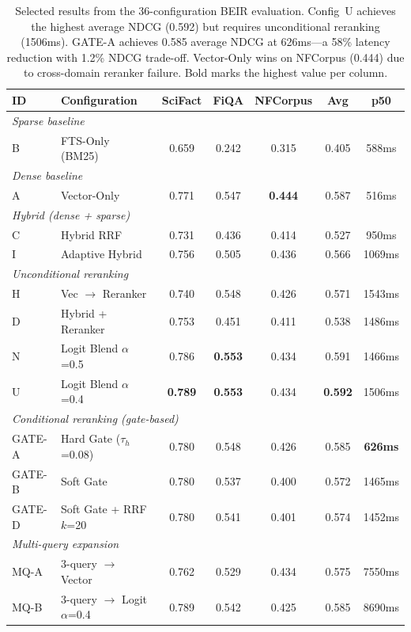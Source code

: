 \documentclass[11pt]{article}
\begin{document}
\begin{table}[H]
\centering
\small
\begin{tabular}{llccccc}
\toprule
\textbf{ID} & \textbf{Configuration} & \textbf{SciFact} & \textbf{FiQA} & \textbf{NFCorpus} & \textbf{Avg} & \textbf{p50} \\
\midrule
\multicolumn{7}{l}{\textit{Sparse baseline}} \\
B & FTS-Only (BM25) & 0.659 & 0.242 & 0.315 & 0.405 & 588ms \\
\midrule
\multicolumn{7}{l}{\textit{Dense baseline}} \\
A & Vector-Only & 0.771 & 0.547 & \textbf{0.444} & 0.587 & 516ms \\
\midrule
\multicolumn{7}{l}{\textit{Hybrid (dense + sparse)}} \\
C & Hybrid RRF & 0.731 & 0.436 & 0.414 & 0.527 & 950ms \\
I & Adaptive Hybrid & 0.756 & 0.505 & 0.436 & 0.566 & 1069ms \\
\midrule
\multicolumn{7}{l}{\textit{Unconditional reranking}} \\
H & Vec $\to$ Reranker & 0.740 & 0.548 & 0.426 & 0.571 & 1543ms \\
D & Hybrid + Reranker & 0.753 & 0.451 & 0.411 & 0.538 & 1486ms \\
N & Logit Blend $\alpha$=0.5 & 0.786 & \textbf{0.553} & 0.434 & 0.591 & 1466ms \\
U & Logit Blend $\alpha$=0.4 & \textbf{0.789} & \textbf{0.553} & 0.434 & \textbf{0.592} & 1506ms \\
\midrule
\multicolumn{7}{l}{\textit{Conditional reranking (gate-based)}} \\
GATE-A & Hard Gate ($\tau_h$=0.08) & 0.780 & 0.548 & 0.426 & 0.585 & \textbf{626ms} \\
GATE-B & Soft Gate & 0.780 & 0.537 & 0.400 & 0.572 & 1465ms \\
GATE-D & Soft Gate + RRF $k$=20 & 0.780 & 0.541 & 0.401 & 0.574 & 1452ms \\
\midrule
\multicolumn{7}{l}{\textit{Multi-query expansion}} \\
MQ-A & 3-query $\to$ Vector & 0.762 & 0.529 & 0.434 & 0.575 & 7550ms \\
MQ-B & 3-query $\to$ Logit $\alpha$=0.4 & 0.789 & 0.542 & 0.425 & 0.585 & 8690ms \\
\bottomrule
\end{tabular}
\caption{Selected results from the 36-configuration BEIR evaluation. Config~U achieves
the highest average NDCG (0.592) but requires unconditional reranking (1506ms).
GATE-A achieves 0.585 average NDCG at 626ms---a 58\% latency reduction with 1.2\%
NDCG trade-off. Vector-Only wins on NFCorpus (0.444) due to cross-domain reranker
failure. Bold marks the highest value per column.}
\label{tab:main-results}
\end{table}
\end{document}

